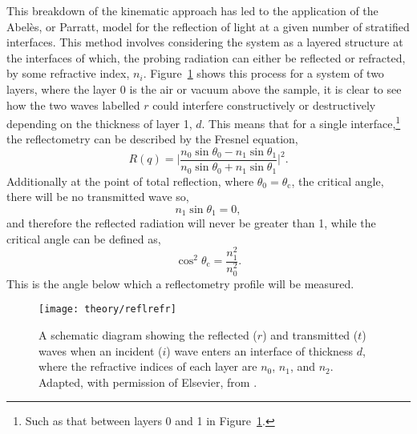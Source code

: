 This breakdown of the kinematic approach has led to the application of the Abel\`{e}s, or Parratt, model for the reflection of light at a given number of stratified interfaces.\autocite[also known as dynamical theory]{abeles_sur_1948,parratt_surface_1954}
This method involves considering the system as a layered structure at the interfaces of which, the probing radiation can either be reflected or refracted, by some refractive index, $n_i$.
Figure~\ref{fig:reflrefr} shows this process for a system of two layers, where the layer \num{0} is the air or vacuum above the sample, it is clear to see how the two waves labelled $r$ could interfere constructively or destructively depending on the thickness of layer \num{1}, $d$.
This means that for a single interface,\footnote{Such as that between layers \num{0} and \num{1} in Figure~\ref{fig:reflrefr}.} the reflectometry can be described by the Fresnel equation,
%
\begin{equation}
    R(q) = \bigg| \frac{n_0\sin{\theta_0} - n_1\sin{\theta_1}}{n_0\sin{\theta_0} + n_1\sin{\theta_1}} \bigg|^2.
\end{equation}
%
Additionally at the point of total reflection, where $\theta_0 = \theta_{\text{c}}$, the critical angle, there will be no transmitted wave so,
%
\begin{equation}
    n_1\sin{\theta_1} = 0,
\end{equation}
%
and therefore the reflected radiation will never be greater than 1, while the critical angle can be defined as,
%
\begin{equation}
    \cos^2{\theta_{\text{c}}} = \frac{n_1^2}{n_0^2}.
\end{equation}
%
This is the angle below which a reflectometry profile will be measured.
%
\begin{figure}[t]
    \centering
    \texttt{[image: theory/reflrefr]}
    \caption{A schematic diagram showing the reflected ($r$) and transmitted ($t$) waves when an incident ($i$) wave enters an interface of thickness $d$, where the refractive indices of each layer are $n_0$, $n_1$, and $n_2$. Adapted, with permission of Elsevier, from \cite{foglia_studies_2015}.}
    \label{fig:reflrefr}
\end{figure}
%

